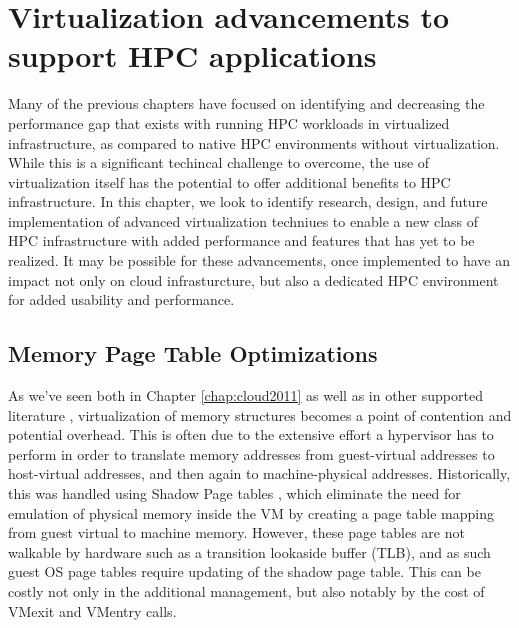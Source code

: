 
\chapter{Virtualization advancements to support HPC applications}
\label{chap:future-work}

Many of the previous chapters have focused on identifying and decreasing the performance gap that exists with running HPC workloads in virtualized infrastructure, as compared to native HPC environments without virtualization. While this is a significant techincal challenge to overcome, the use of virtualization itself has the potential to offer additional benefits to HPC infrastructure. In this chapter, we look to identify research, design, and future implementation of advanced virtualization techniues to enable a new class of HPC infrastructure with added performance and features that has yet to be realized.  It may be possible for these advancements, once implemented to have an impact not only on cloud infrasturcture, but also a dedicated HPC environment for added usability and performance. 

\section{Memory Page Table Optimizations}

As we've seen both in Chapter \ref{chap:cloud2011} as well as in other supported literature \cite{MagellanFinal}, virtualization of memory structures becomes a point of contention and potential overhead. This is often due to the extensive effort a hypervisor has to perform in order to translate memory addresses from guest-virtual addresses to host-virtual addresses, and then again to machine-physical addresses.  Historically, this was handled using Shadow Page tables \cite{rosenblum2005virtual}, which eliminate the need for emulation of physical memory inside the VM by creating a page table mapping from guest virtual to machine memory. However, these page tables are not walkable by hardware such as a transition lookaside buffer (TLB), and as such guest OS page tables require updating of the shadow page table. This can be costly not only in the additional management, but also notably by the cost of VMexit and VMentry calls.

